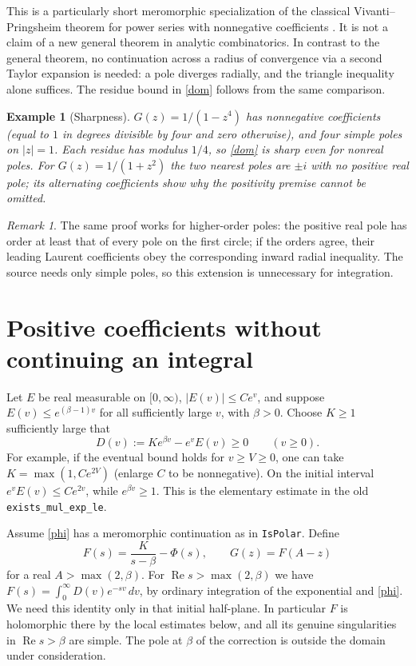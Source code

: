 \documentclass[11pt]{article}
\newtheorem{example}[theorem]{Example}
\theoremstyle{remark}\newtheorem{remark}[theorem]{Remark}
\newcommand{\Rea}{\operatorname{Re}}\newcommand{\abs}[1]{\left|#1\right|}
\begin{document}
This is a particularly short meromorphic specialization of the classical Vivanti--Pringsheim theorem for power series with nonnegative coefficients \cite{FS}. It is not a claim of a new general theorem in analytic combinatorics. In contrast to the general theorem, no continuation across a radius of convergence via a second Taylor expansion is needed: a pole diverges radially, and the triangle inequality alone suffices. The residue bound in \eqref{dom} follows from the same comparison.

\begin{example}[Sharpness]\label{ex:sharp}
$G(z)=1/(1-z^4)$ has nonnegative coefficients (equal to $1$ in degrees divisible by four and zero otherwise), and four simple poles on $|z|=1$. Each residue has modulus $1/4$, so \eqref{dom} is sharp even for nonreal poles. For $G(z)=1/(1+z^2)$ the two nearest poles are $\pm i$ with no positive real pole; its alternating coefficients show why the positivity premise cannot be omitted.
\end{example}
\begin{remark}
The same proof works for higher-order poles: the positive real pole has order at least that of every pole on the first circle; if the orders agree, their leading Laurent coefficients obey the corresponding inward radial inequality. The source needs only simple poles, so this extension is unnecessary for integration.
\end{remark}

\section{Positive coefficients without continuing an integral}\label{sec:positive}
Let $E$ be real measurable on $[0,\infty)$, $|E(v)|\le Ce^v$, and suppose $E(v)\le e^{(\beta-1)v}$ for all sufficiently large $v$, with $\beta>0$. Choose $K\ge1$ sufficiently large that
\begin{equation}\label{density}
 D(v):=K e^{\beta v}-e^vE(v)\ge0\qquad(v\ge0).
\end{equation}
For example, if the eventual bound holds for $v\ge V\ge0$, one can take $K=\max(1,C e^{2V})$ (enlarge $C$ to be nonnegative). On the initial interval $e^vE(v)\le C e^{2v}$, while $e^{\beta v}\ge1$. This is the elementary estimate in the old \texttt{exists\_mul\_exp\_le}.

Assume \eqref{phi} has a meromorphic continuation as in \texttt{IsPolar}. Define
\[
 F(s)=\frac{K}{s-\beta}-\Phi(s),\qquad G(z)=F(A-z)
\]
for a real $A>\max(2,\beta)$. For $\Rea s>\max(2,\beta)$ we have $F(s)=\int_0^\infty D(v)e^{-sv}\,dv$, by ordinary integration of the exponential and \eqref{phi}. We need this identity only in that initial half-plane. In particular $F$ is holomorphic there by the local estimates below, and all its genuine singularities in $\Rea s>\beta$ are simple. The pole at $\beta$ of the correction is outside the domain under consideration.
\end{document}
